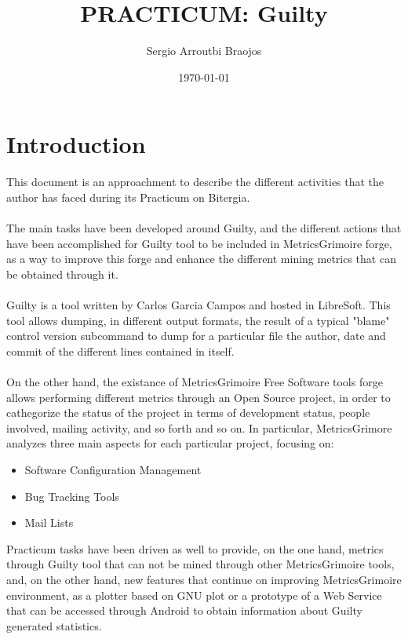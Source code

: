 \documentclass[11pt]{article}
\title{\textbf{PRACTICUM: Guilty}}
\author{Sergio Arroutbi Braojos}
\date{\today}
\begin{document}
\maketitle

\section{Introduction}
This document is an approachment to describe the different activities that the author has faced during its Practicum on Bitergia.\\
\\
The main tasks have been developed around Guilty, and the different actions that have been accomplished for Guilty tool to be included in MetricsGrimoire forge, as a way to improve this forge and enhance the different mining metrics that can be obtained through it.\\
\\
Guilty is a tool written by Carlos Garcia Campos and hosted in LibreSoft. This tool allows dumping, in different output formats, the result of a typical "blame" control version subcommand to dump for a particular file the author, date and commit of the different lines contained in itself.\\
\\
On the other hand, the existance of MetricsGrimoire Free Software tools forge allows performing different metrics through an Open Source project, in order to cathegorize the status of the project in terms of development status, people involved, mailing activity, and so forth and so on. In particular, MetricsGrimore analyzes three main aspects for each particular project, focusing on:
\begin{itemize}
\item{Software Configuration Management}
\item{Bug Tracking Tools}
\item{Mail Lists}
\end{itemize}
Practicum tasks have been driven as well to provide, on the one hand, metrics through Guilty tool that can not be mined through other MetricsGrimoire tools, and, on the other hand, new features that continue on improving MetricsGrimoire environment, as a plotter based on GNU plot or a prototype of a Web Service that can be accessed through Android to obtain information about Guilty generated statistics.
\end{document}
